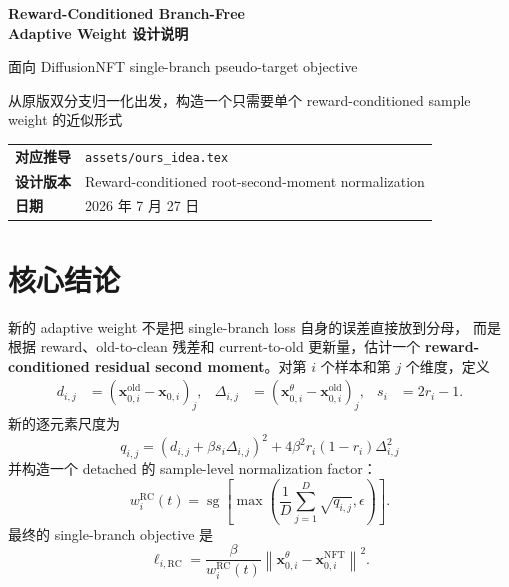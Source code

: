 \documentclass[11pt,a4paper]{article}
\renewcommand{\contentsname}{目录}
\renewcommand{\tablename}{表}
\newcommand{\sg}{\operatorname{sg}}
\newcommand{\xcur}{\mathbf{x}_{0,i}^{\theta}}
\newcommand{\xold}{\mathbf{x}_{0,i}^{\mathrm{old}}}
\newcommand{\xclean}{\mathbf{x}_{0,i}}
\newcommand{\xtarget}{\mathbf{x}_{0,i}^{\mathrm{NFT}}}
\newcommand{\eps}{\epsilon}
\newcommand{\R}{\mathrm{RC}}
\begin{document}
\renewcommand{\contentsname}{目录}
\renewcommand{\tablename}{表}
\hypersetup{pageanchor=false}

\begin{titlepage}
\thispagestyle{empty}
\vspace*{28mm}
\noindent{\color{accent}\rule{\textwidth}{2.2pt}}
\vspace{10mm}

{\sffamily\bfseries\fontsize{23}{31}\selectfont
Reward-Conditioned Branch-Free\\[2mm]
Adaptive Weight 设计说明}

\vspace{8mm}
{\Large 面向 DiffusionNFT single-branch pseudo-target objective}

\vspace{17mm}
{\large
从原版双分支归一化出发，构造一个只需要单个 reward-conditioned
sample weight 的近似形式}

\vfill

\begin{tabular}{@{}ll@{}}
\textbf{对应推导} & \texttt{assets/ours\_idea.tex}\\
\textbf{设计版本} & Reward-conditioned root-second-moment normalization\\
\textbf{日期} & 2026 年 7 月 27 日
\end{tabular}

\vspace{15mm}
\noindent{\color{accent}\rule{\textwidth}{0.8pt}}
\end{titlepage}

\hypersetup{pageanchor=true}
\tableofcontents
\clearpage
{}

\section{核心结论}

新的 adaptive weight 不是把 single-branch loss 自身的误差直接放到分母，
而是根据 reward、old-to-clean 残差和 current-to-old 更新量，估计一个
\textbf{reward-conditioned residual second moment}。对第 $i$ 个样本和第
$j$ 个维度，定义
\begin{align}
d_{i,j}
&=
\left(\xold-\xclean\right)_j,
&
\Delta_{i,j}
&=
\left(\xcur-\xold\right)_j,
&
s_i
&=2r_i-1.
\end{align}
新的逐元素尺度为
\begin{equation}
\boxed{
q_{i,j}
=
\left(d_{i,j}+\beta s_i\Delta_{i,j}\right)^2
+
4\beta^2r_i(1-r_i)\Delta_{i,j}^2
}
\label{eq:q-main}
\end{equation}
并构造一个 detached 的 sample-level normalization factor：
\begin{equation}
\boxed{
w_i^{\R}(t)
=
\sg\!\left[
\max\!\left(
\frac{1}{D}\sum_{j=1}^{D}\sqrt{q_{i,j}},
\eps
\right)
\right].
}
\label{eq:w-main}
\end{equation}
最终的 single-branch objective 是
\begin{equation}
\boxed{
\ell_{i,\R}
=
\frac{\beta}{w_i^{\R}(t)}
\left\|
\xcur-\xtarget
\right\|^2.
}
\label{eq:loss-main}
\end{equation}
\end{document}
